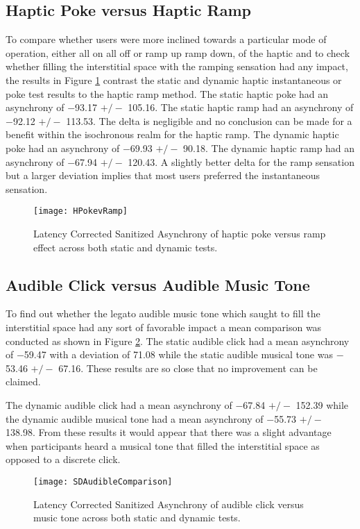 \subsection{Haptic Poke versus Haptic Ramp}
To compare whether users were more inclined towards a particular mode of operation, either all on all off or ramp up ramp down, of the haptic and to check whether filling the interstitial space with the ramping sensation had any impact, the results in Figure \ref{fig:HPokevRamp} contrast the static and dynamic haptic instantaneous or poke test results to the haptic ramp method. The static haptic poke had an asynchrony of $-$93.17 $+/-$ 105.16. The static haptic ramp had an asynchrony of $-$92.12 $+/-$ 113.53. The delta is negligible and no conclusion can be made for a benefit within the isochronous realm for the haptic ramp. The dynamic haptic poke had an asynchrony of $-$69.93 $+/-$ 90.18. The dynamic haptic ramp had an asynchrony of $-$67.94 $+/-$ 120.43. A slightly better delta for the ramp sensation but a larger deviation implies that most users preferred the instantaneous sensation.
\begin{figure}[H]
    \centering
    \texttt{[image: HPokevRamp]}
    \caption{Latency Corrected Sanitized Asynchrony of haptic poke versus ramp effect across both static and dynamic tests.}
    \label{fig:HPokevRamp}
\end{figure}

\subsection{Audible Click versus Audible Music Tone}
To find out whether the legato audible music tone which saught to fill the interstitial space had any sort of favorable impact a mean comparison was conducted as shown in Figure \ref{fig:SDAudibleComparison}. The static audible click had a mean asynchrony of $-$59.47 with a deviation of 71.08 while the static audible musical tone was $-$53.46 $+/-$ 67.16. These results are so close that no improvement can be claimed.

The dynamic audible click had a mean asynchrony of $-$67.84 $+/-$ 152.39 while the dynamic audible musical tone had a mean asynchrony of $-$55.73 $+/-$ 138.98. From these results it would appear that there was a slight advantage when participants heard a musical tone that filled the interstitial space as opposed to a discrete click. 
\begin{figure}[H]
    \centering
    \texttt{[image: SDAudibleComparison]}
    \caption{Latency Corrected Sanitized Asynchrony of audible click versus music tone across both static and dynamic tests.}
    \label{fig:SDAudibleComparison}
\end{figure}
